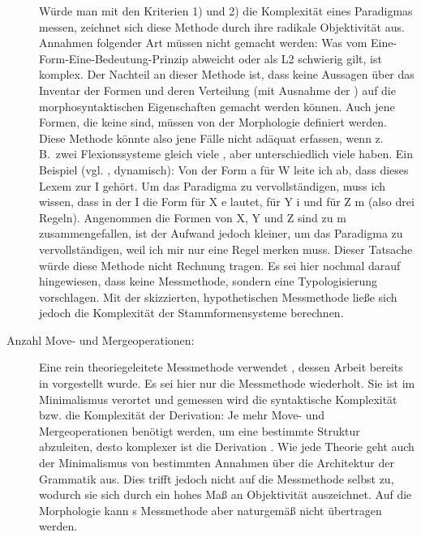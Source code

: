 \begin{exe}
\begin{exe}
\begin{description}
Würde man mit den Kriterien 1) und 2) die Komplexität eines Paradigmas messen, zeichnet sich diese Methode durch ihre radikale Objektivität aus. Annahmen folgender Art müssen nicht gemacht werden: Was vom Eine-Form-Eine-Bedeutung-Prinzip abweicht oder als L2 schwierig gilt, ist komplex. Der Nachteil an dieser Methode ist, dass keine Aussagen über das Inventar der Formen und deren Verteilung (mit Ausnahme der ) auf die morphosyntaktischen Eigenschaften gemacht werden können. Auch jene Formen, die keine  sind, müssen von der Morphologie definiert werden. Diese Methode könnte also jene Fälle nicht adäquat erfassen, wenn z.\,B.\ zwei Flexionssysteme gleich viele , aber unterschiedlich viele  haben. Ein Beispiel (vgl. , dynamisch): Von der Form a für W leite ich ab, dass dieses Lexem zur  I gehört. Um das Paradigma zu vervollständigen, muss ich wissen, dass in der  I die Form für X e lautet, für Y i und für Z m (also drei Regeln). Angenommen die Formen von X, Y und Z sind zu m zusammengefallen, ist der Aufwand jedoch kleiner, um das Paradigma zu vervollständigen, weil ich mir nur eine Regel merken muss. Dieser Tatsache würde diese Methode nicht Rechnung tragen. Es sei hier nochmal darauf hingewiesen, dass \citet{FinkelStump2007} keine Messmethode, sondern eine Typologisierung vorschlagen. Mit der skizzierten, hypothetischen Messmethode ließe sich jedoch die Komplexität der Stammformensysteme berechnen.

\item[Anzahl Move- und Mergeoperationen:] Eine rein theoriegeleitete Messmethode verwendet \citet{Garzonio2016}, dessen Arbeit bereits in  vorgestellt wurde. Es sei hier nur die Messmethode wiederholt. Sie ist im Minimalismus verortet und gemessen wird die syntaktische Komplexität bzw. die Komplexität der Derivation: Je mehr Move- und Mergeoperationen benötigt werden, um eine bestimmte Struktur abzuleiten, desto komplexer ist die Derivation \citep[99]{Garzonio2016}. Wie jede Theorie geht auch der Minimalismus von bestimmten Annahmen über die Architektur der Grammatik aus. Dies trifft jedoch nicht auf die Messmethode selbst zu, wodurch sie sich durch ein hohes Maß an Objektivität auszeichnet. Auf die Morphologie kann \citeauthor{Garzonio2016}s Messmethode aber naturgemäß nicht übertragen werden.


\end{description}
\end{exe}
\end{exe}

